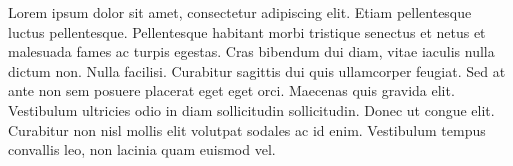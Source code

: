 Lorem ipsum dolor sit amet, consectetur adipiscing elit. Etiam pellentesque luctus pellentesque. Pellentesque habitant morbi tristique senectus et netus et malesuada fames ac turpis egestas. Cras bibendum dui diam, vitae iaculis nulla dictum non. Nulla facilisi. Curabitur sagittis dui quis ullamcorper feugiat. Sed at ante non sem posuere placerat eget eget orci. Maecenas quis gravida elit. Vestibulum ultricies odio in diam sollicitudin sollicitudin. Donec ut congue elit. Curabitur non nisl mollis elit volutpat sodales ac id enim. Vestibulum tempus convallis leo, non lacinia quam euismod vel. 